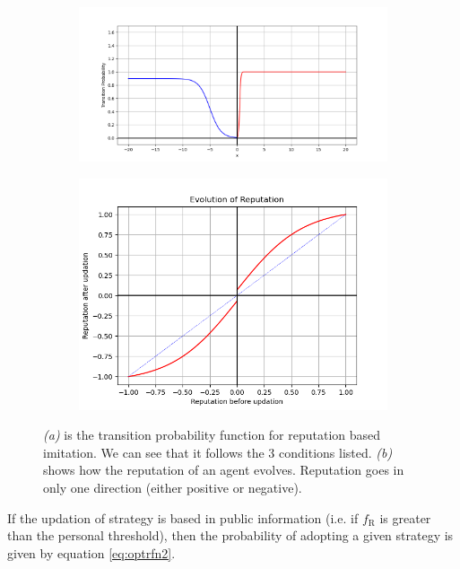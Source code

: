\documentclass[11pt, A4 paper, twocolumn ]{article}
\newcommand{\fr}{$ f_{\text{R}} $}
\begin{document}
\begin{figure}[h]
	\centering
	\begin{subfigure}[b]{0.5\textwidth}
		\centering
		\includegraphics[width=\textwidth]{graphs/transprob_opdyn}
		\caption{}
		\label{fig:oprep1}
	\end{subfigure}
	\begin{subfigure}[b]{0.3\textwidth}
		\centering
		\includegraphics[width=\textwidth]{graphs/repevol_C3}
		\caption{}
		\label{fig:oprep2}
	\end{subfigure}
	\caption{\footnotesize \textit{(a)} is the transition probability function for reputation based imitation. We can see that it follows the 3 conditions listed. \textit{(b)} shows how the reputation of an agent evolves. Reputation goes in only one direction (either positive or negative). }
	\label{fig:oprep}
\end{figure}

If the updation of strategy is based in public information (i.e. if \fr{} is greater than the personal threshold), then the probability of adopting a given strategy is given by equation \ref{eq:optrfn2}. 
\end{document}
